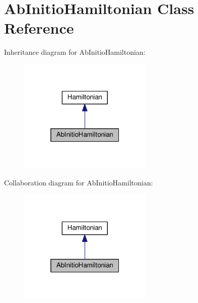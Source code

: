 \hypertarget{classAbInitioHamiltonian}{}\section{Ab\+Initio\+Hamiltonian Class Reference}
\label{classAbInitioHamiltonian}


Inheritance diagram for Ab\+Initio\+Hamiltonian\+:\nopagebreak
\begin{figure}[H]
\begin{center}
\leavevmode
\includegraphics[width=181pt]{classAbInitioHamiltonian__inherit__graph}
\end{center}
\end{figure}


Collaboration diagram for Ab\+Initio\+Hamiltonian\+:\nopagebreak
\begin{figure}[H]
\begin{center}
\leavevmode
\includegraphics[width=181pt]{classAbInitioHamiltonian__coll__graph}
\end{center}
\end{figure}
